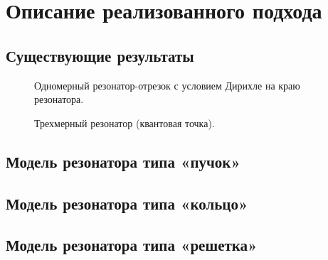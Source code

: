 \chapter{Описание реализованного подхода}
\label{chapter2}

\section{Существующие результаты}

\begin{figure}[!htb]
\centering
\begin{tikzpicture}[scale=1.1]

\end{tikzpicture}
\caption{Одномерный резонатор-отрезок с условием Дирихле на краю резонатора.}
\end{figure}

\begin{figure}[!htb]
\centering
\begin{tikzpicture}[scale=1.1]

\end{tikzpicture}
\caption{Трехмерный резонатор (квантовая точка).}
\end{figure}


\section{Модель резонатора типа «пучок»} %



\section{Модель резонатора типа «кольцо»}


\section{Модель резонатора типа «решетка»}

